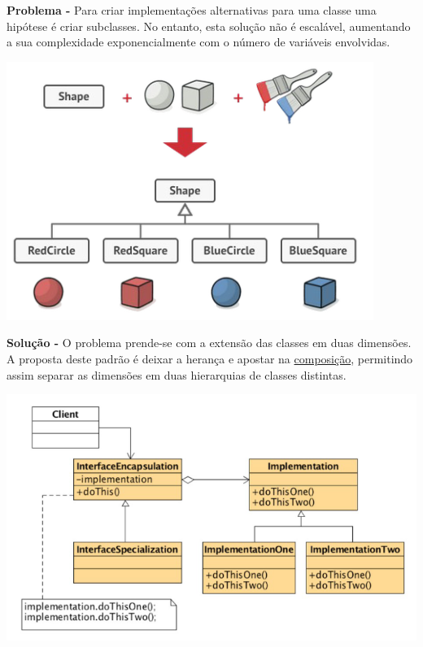 \documentclass{article}
\begin{document}
\begin{flushleft}
    \textbf{Problema -} Para criar implementações alternativas para uma classe uma
    hipótese é criar subclasses. No entanto, esta solução não é
    escalável, aumentando a sua complexidade exponencialmente
    com o número de variáveis envolvidas.

    \begin{center}
        \includegraphics[scale=0.3]{Images/42.png}
    \end{center}

\end{flushleft}

\begin{flushleft}
    \textbf{Solução -} O problema prende-se com a extensão das classes em duas dimensões. A proposta
    deste padrão é deixar a herança e apostar na \uline{composição}, permitindo assim separar
    as dimensões em duas hierarquias de classes distintas.

    \begin{center}
        \includegraphics[scale=0.4]{Images/43.png}
    \end{center}
\end{flushleft}
\end{document}
